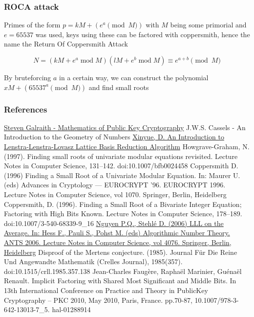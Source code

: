 \documentclass{beamer}
\begin{document}
\begin{frame}
    \frametitle{ROCA attack}
    Primes of the form $p=kM+\left(e^a\pmod M\right)$ with $M$ being some primorial and $e=65537$ was used, keys using these can be factored with coppersmith, hence the name the Return Of Coppersmith Attack\pause

    $$N=(kM+e^a\operatorname{mod}M)(lM+e^b\operatorname{mod}M)\equiv e^{a+b}\pmod M$$

    By bruteforcing $a$ in a certain way, we can construct the polynomial $xM+\left(65537^a\pmod M\right)$ and find small roots
\end{frame}

\begin{frame}
	\frametitle{References}
    {\fontsize{3.5}{3.5}
    \begin{thebibliography}{11}
        \href{https://www.math.auckland.ac.nz/~sgal018/crypto-book/crypto-book.html}{Steven Galraith - Mathematics of Public Key Cryptography}
        J.W.S. Cassels - An Introduction to the Geometry of Numbers
        \href{https://math.mit.edu/~apost/courses/18.204-2016/18.204_Xinyue_Deng_final_paper.pdf}{Xinyue, D. An Introduction to Lenstra-Lenstra-Lovasz Lattice Basis Reduction Algorithm}
        Howgrave-Graham, N. (1997). Finding small roots of univariate modular equations revisited. Lecture Notes in Computer Science, 131–142. doi:10.1007/bfb0024458
        Coppersmith D. (1996) Finding a Small Root of a Univariate Modular Equation. In: Maurer U. (eds) Advances in Cryptology — EUROCRYPT ’96. EUROCRYPT 1996. Lecture Notes in Computer Science, vol 1070. Springer, Berlin, Heidelberg
        Coppersmith, D. (1996). Finding a Small Root of a Bivariate Integer Equation; Factoring with High Bits Known. Lecture Notes in Computer Science, 178–189. doi:10.1007/3-540-68339-9\_16 
        \href{http://perso.ens-lyon.fr/damien.stehle/downloads/average-corrected.pdf}{Nguyen P.Q., Stehlé D. (2006) LLL on the Average. In: Hess F., Pauli S., Pohst M. (eds) Algorithmic Number Theory. ANTS 2006. Lecture Notes in Computer Science, vol 4076. Springer, Berlin, Heidelberg}
        Disproof of the Mertens conjecture. (1985). Journal Für Die Reine Und Angewandte Mathematik (Crelles Journal), 1985(357). doi:10.1515/crll.1985.357.138
        Jean-Charles Faug\`ere, Rapha\"el Marinier, Gu\'ena\"el Renault.  Implicit Factoring with Shared Most Significant and Middle Bits.  In 13th International Conference on Practice and Theory in PublicKey Cryptography – PKC 2010, May 2010, Paris, France. pp.70-87, 10.1007/978-3-642-13013-7\_5. hal-01288914

\end{thebibliography}}
\end{frame}
\end{document}
